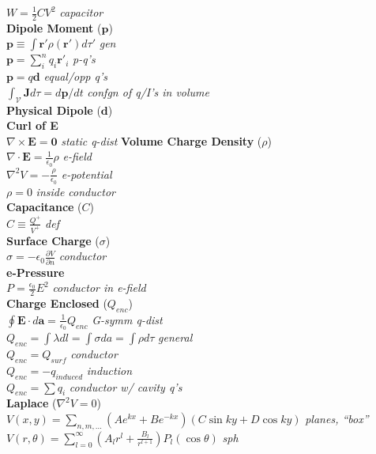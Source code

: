 \documentclass[9pt]{extarticle}
\begin{document}
\begin{multicols}{3}
$W = \frac{1}{2}CV^{2}$ \textit{capacitor} \\
\textbf{Dipole Moment} ($\mathbf{p}$) \\
$\mathbf{p} \equiv \int{\mathbf{r}' \rho(\mathbf{r}') d\tau'}$ \textit{gen} \\
$\mathbf{p} = \sum_{i}^{n}q_{i}\mathbf{r'}_{i}$ \textit{p-q's} \\
$\mathbf{p} = q\mathbf{d}$ \textit{equal/opp q's} \\
$\int_{\mathcal{V}} \mathbf{J}d\tau = d\mathbf{p}/dt$ \textit{confgn of q/I's in volume} \\
\textbf{Physical Dipole} ($\mathbf{d}$) \\
\textbf{Curl of E} \\
$\nabla\times\mathbf{E} = \mathbf{0}$ \textit{static q-dist}
\textbf{Volume Charge Density} ($\rho$) \\
$\nabla\cdot\mathbf{E} = \frac{1}{\epsilon_{0}}\rho$ \textit{e-field} \\
$\nabla^{2}V = -\frac{\rho}{\epsilon_{0}}$ \textit{e-potential} \\
$\rho = 0$ \textit{inside conductor} \\
\textbf{Capacitance} ($C$) \\
$C \equiv \frac{Q^{+}}{V^{+}}$ \textit{def} \\
\textbf{Surface Charge} ($\sigma$) \\
$\sigma = -\epsilon_{0}\frac{\partial V}{\partial n}$ \textit{conductor} \\
\textbf{e-Pressure} \\
$P = \frac{\epsilon_{0}}{2}E^{2}$ \textit{conductor in e-field} \\
\textbf{Charge Enclosed} ($Q_{enc}$) \\
$\oint\mathbf{E}\cdot d\mathbf{a} = \frac{1}{\epsilon_{0}}Q_{enc}$ \textit{G-symm q-dist} \\
$Q_{enc} = \int\lambda dl = \int\sigma da = \int\rho d\tau$ \textit{general} \\
$Q_{enc} = Q_{surf}$ \textit{conductor} \\
$Q_{enc} = -q_{induced}$ \textit{induction} \\
$Q_{enc} = \sum q_{i}$ \textit{conductor w/ cavity q's} \\
\textbf{Laplace} ($\nabla^{2}V = 0$) \\
$V(x, y) = \sum_{n,m,\ldots}(Ae^{kx} + Be^{-kx})(C\sin{ky} + D\cos{ky})$  \textit{planes, ``box''} \\
$V(r, \theta) = \sum_{l=0}^{\infty} \left(A_{l}r^{l} + \frac{B_{l}}{r^{l + 1}}\right)P_{l}(\cos{\theta})$ \textit{sph} \\

\end{multicols}
\end{document}
